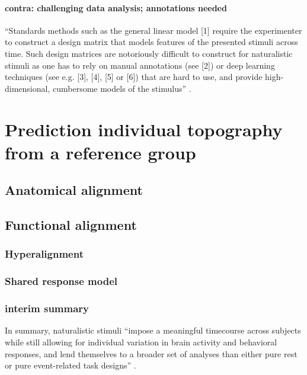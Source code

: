 \paragraph{contra: challenging data analysis; annotations needed}


``Standards methods such as the general linear model [1] require the
experimenter to construct a design matrix that models features of the presented
stimuli across time. Such design matrices are notoriously difficult to construct
for naturalistic stimuli as one has to rely on manual annotations (see [2]) or
deep learning techniques (see e.g. [3], [4], [5] or [6]) that are hard to use,
and provide high-dimensional, cumbersome models of the stimulus''
\citep{richard2019fast}.


\section{Prediction individual topography from a reference group}




\subsection{Anatomical alignment}



\subsection{Functional alignment}


\subsubsection{Hyperalignment}


\subsubsection{Shared response model}


\subsubsection{interim summary}
In summary, naturalistic stimuli ``impose a meaningful timecourse across
subjects while still allowing for individual variation in brain activity and
behavioral responses, and lend themselves to a broader set of analyses than
either pure rest or pure event-related task designs'' \citep{finn2017can}.

